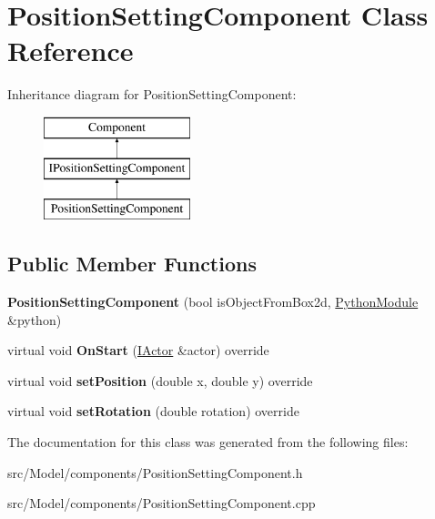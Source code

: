 \hypertarget{classPositionSettingComponent}{}\section{Position\+Setting\+Component Class Reference}
\label{classPositionSettingComponent}
Inheritance diagram for Position\+Setting\+Component\+:\begin{figure}[H]
\begin{center}
\leavevmode
\includegraphics[height=3.000000cm]{classPositionSettingComponent}
\end{center}
\end{figure}
\subsection*{Public Member Functions}
\begin{DoxyCompactItemize}
\item 
{\bfseries Position\+Setting\+Component} (bool is\+Object\+From\+Box2d, \hyperlink{classPythonModule}{Python\+Module} \&python)\hypertarget{classPositionSettingComponent_a9c082cd8a18c311a57539ef30b4a616f}{}\label{classPositionSettingComponent_a9c082cd8a18c311a57539ef30b4a616f}

\item 
virtual void {\bfseries On\+Start} (\hyperlink{classIActor}{I\+Actor} \&actor) override\hypertarget{classPositionSettingComponent_ab9aa71aa85991aabe7312f9e5329d84e}{}\label{classPositionSettingComponent_ab9aa71aa85991aabe7312f9e5329d84e}

\item 
virtual void {\bfseries set\+Position} (double x, double y) override\hypertarget{classPositionSettingComponent_a9cfe101863f6d5d8d617da2e07f980be}{}\label{classPositionSettingComponent_a9cfe101863f6d5d8d617da2e07f980be}

\item 
virtual void {\bfseries set\+Rotation} (double rotation) override\hypertarget{classPositionSettingComponent_a46d47b7c62cc1e4b43eaced66d63e9e9}{}\label{classPositionSettingComponent_a46d47b7c62cc1e4b43eaced66d63e9e9}

\end{DoxyCompactItemize}


The documentation for this class was generated from the following files\+:\begin{DoxyCompactItemize}
\item 
src/\+Model/components/Position\+Setting\+Component.\+h\item 
src/\+Model/components/Position\+Setting\+Component.\+cpp\end{DoxyCompactItemize}
